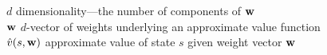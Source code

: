\documentclass[a4paper, twoside, 12pt]{article}
\begin{document}
\begin{tabbing}
    \>$d$                 \> dimensionality---the number of components of ${\bf w}$\\
    \>${\bf w}$           \> $d$-vector of weights underlying an approximate value function\\
    \>$\hat v(s,{\bf w})$      \> approximate value of state $s$ given weight vector ${\bf w}$\\

\end{tabbing}
\end{document}
